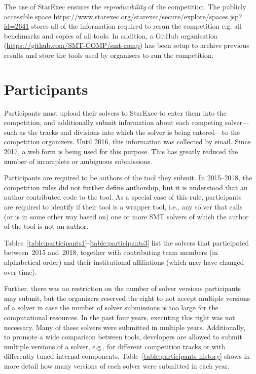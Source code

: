 \documentclass[dvipsnames,table,twoside,11pt]{article}
\begin{document}
The use of StarExec ensures the \emph{reproducibility} of the competition. The publicly accessible space \url{https://www.starexec.org/starexec/secure/explore/spaces.jsp?id=2641} stores all of the information required to rerun the competition e.g. all benchmarks and copies of all tools. In addition, a GitHub organisation (\url{https://github.com/SMT-COMP/smt-comp}) has been setup to archive previous results and store the tools used by organisers to run the competition.


\section{Participants}
\label{sec:participants}

Participants must upload their solvers to StarExec to enter them into
the competition, and additionally submit information about each
competing solver---such as the tracks and divisions into which the
solver is being entered---to the competition organizers.  Until 2016,
this information was collected by email.  Since 2017, a web form is
being used for this purpose.  This has greatly reduced the number of
incomplete or ambiguous submissions.

Participants are required to be authors of the tool they submit.
In 2015--2018, the competition rules did not further define authorship,
but it is understood that an author contributed code to the tool.
As a special case of this rule, participants are required to identify
if their tool is a wrapper tool, i.e., any solver that calls (or is in some
other way based on) one or more SMT solvers of which the author of the tool
is not an author.

Tables~\ref{table:participants1}-\ref{table:participants3} list the solvers
that participated between~2015 and~2018, together with contributing team
members (in alphabetical order) and their institutional affiliations (which may
have changed over time).

Further, there was no restriction on the number of solver versions participants
may submit, but the organizers reserved the right to not accept multiple
versions of a solver in case the number of solver submissions is too large for
the computational resources. In the past four years, executing this right was
not necessary.
%
Many of these solvers were submitted in multiple years.  Additionally,
to promote a wide comparison between tools, developers are allowed to
submit multiple versions of a solver, e.g., for different competition
tracks or with differently tuned internal components.
Table~\ref{table:participants-history} shows in more detail how many
versions of each solver were submitted in each year.
\end{document}
